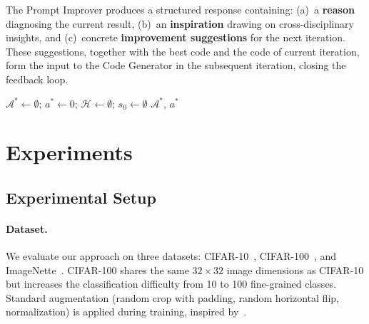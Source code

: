 \documentclass[10pt,twocolumn,letterpaper]{article}
\begin{document}
	The Prompt Improver produces a structured response containing: (a)~a \textbf{reason} diagnosing the current result, (b)~an \textbf{inspiration} drawing on cross-disciplinary insights, and (c)~concrete \textbf{improvement suggestions} for the next iteration. These suggestions, together with the best code and the code of current iteration, form the input to the Code Generator in the subsequent iteration, closing the feedback loop.
    
	
	\begin{algorithm}[t]
		\caption{Iterative LLM-Driven NAS Pipeline}
		\label{alg:pipeline}
		$\mathcal{A}^* \leftarrow \emptyset$; $a^* \leftarrow 0$; $\mathcal{H} \leftarrow \emptyset$; $s_0 \leftarrow \emptyset$\;
		\Return $\mathcal{A}^*$, $a^*$
	\end{algorithm}
	
	
	\section{Experiments}
	\label{sec:experiments}
	
	\subsection{Experimental Setup}
	
	\paragraph{Dataset.} We evaluate our approach on three datasets: CIFAR-10~\cite{Krizhevsky2009}, CIFAR-100~\cite{Krizhevsky2009}, and ImageNette~\cite{imagenette}. CIFAR-100 shares the same $32{\times}32$ image dimensions as CIFAR-10 but increases the classification difficulty from 10 to 100 fine-grained classes. Standard augmentation (random crop with padding, random horizontal flip, normalization) is applied during training, inspired by~\cite{Aboudeshish2025augmentation}.
	
\end{document}
